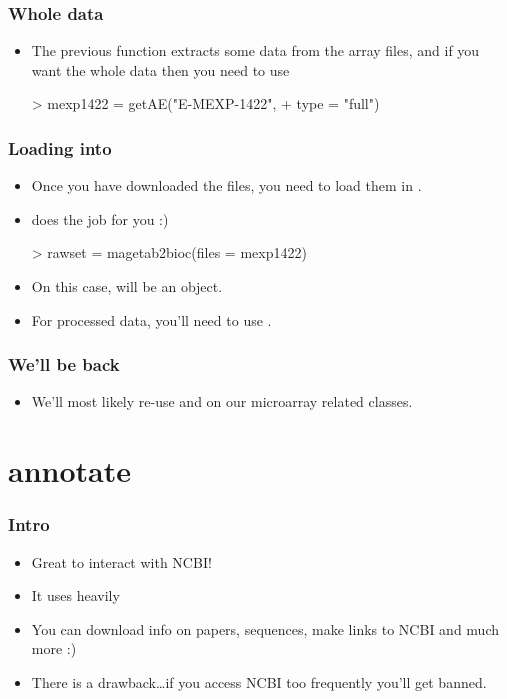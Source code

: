 \begin{frame}
  \frametitle{Whole data}
  \begin{itemize}
  \item The previous function extracts some data from the array files, and if you want the whole data then you need to use 
\begin{Schunk}
\begin{Sinput}
> mexp1422 = getAE("E-MEXP-1422", 
+     type = "full")
\end{Sinput}
\end{Schunk}
  \end{itemize}
\end{frame}

\begin{frame}
  \frametitle{Loading into }
  \begin{itemize}
  \item Once you have downloaded the files, you need to load them in .
  \item {} does the job for you :)
\begin{Schunk}
\begin{Sinput}
> rawset = magetab2bioc(files = mexp1422)
\end{Sinput}
\end{Schunk}
  \item On this case,  will be an  object.
  \item For processed data, you'll need to use .
  \end{itemize}
\end{frame}

\begin{frame}[allowframebreaks]
  \frametitle{We'll be back}
  \begin{itemize}
  \item We'll most likely re-use  and  on our microarray related classes.
  \end{itemize}
\end{frame}


\section{annotate}

\begin{frame}
  \frametitle{Intro}
  \begin{itemize}
  \item Great to interact with NCBI!
  \item It uses  heavily
  \item You can download info on papers, sequences, make links to NCBI and much more :)
  \item There is a \alert{drawback}\ldots if you access NCBI too frequently you'll get banned.
  \end{itemize}
\end{frame}

